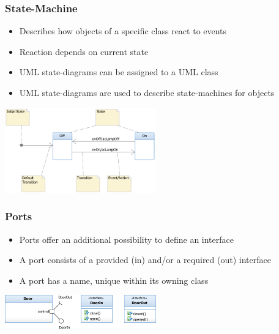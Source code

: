 \begin{paracol}{2}
    \subsubsection{State-Machine}
    \begin{itemize}
        \item Describes how objects of a specific class react to events
        \item Reaction depends on current state
        \item UML state-diagrams can be assigned to a UML class
        \item UML state-diagrams are used to describe state-machines for objects
    \end{itemize}
    \includegraphics[width=0.49\textwidth]{images/UML/class_statemachine.png}

    \switchcolumn

    \subsubsection{Ports}
    \begin{itemize}
        \item Ports offer an additional possibility to define an interface
        \item A port consists of a provided (in) and/or a required (out) interface
        \item A port has a name, unique within its owning class
    \end{itemize}
    \includegraphics[width=0.49\textwidth]{images/UML/class_ports.png}
\end{paracol}

